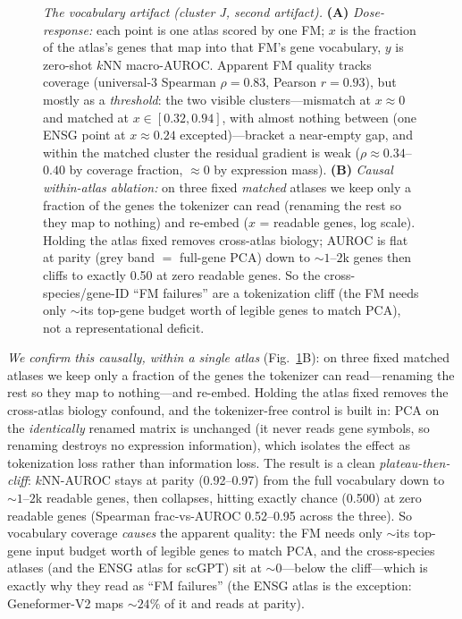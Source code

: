 \documentclass[11pt]{article}
\begin{document}
\begin{figure}[!ht]\centering
\caption{\emph{The vocabulary artifact (cluster J, second artifact).} \textbf{(A)} \emph{Dose-response:} each point is one atlas scored by one FM; $x$ is the fraction of the atlas's genes that map into that FM's gene vocabulary, $y$ is zero-shot $k$NN macro-AUROC. Apparent FM quality tracks coverage (universal-3 Spearman $\rho=0.83$, Pearson $r=0.93$), but mostly as a \emph{threshold}: the two visible clusters---mismatch at $x\!\approx\!0$ and matched at $x\!\in\![0.32,0.94]$, with almost nothing between (one ENSG point at $x\!\approx\!0.24$ excepted)---bracket a near-empty gap, and within the matched cluster the residual gradient is weak ($\rho\approx0.34$--$0.40$ by coverage fraction, $\approx\!0$ by expression mass). \textbf{(B)} \emph{Causal within-atlas ablation:} on three fixed \emph{matched} atlases we keep only a fraction of the genes the tokenizer can read (renaming the rest so they map to nothing) and re-embed ($x$ = readable genes, log scale). Holding the atlas fixed removes cross-atlas biology; AUROC is flat at parity (grey band $=$ full-gene PCA) down to ${\sim}1$--$2$k genes then cliffs to exactly 0.50 at zero readable genes. So the cross-species/gene-ID ``FM failures'' are a tokenization cliff (the FM needs only ${\sim}$its top-gene budget worth of legible genes to match PCA), not a representational deficit.}\label{fig:vocab}\end{figure}

\emph{We confirm this causally, within a single atlas} (Fig.~\ref{fig:vocab}B): on three fixed matched atlases we keep only a fraction of the genes the tokenizer can read---renaming the rest so they map to nothing---and re-embed. Holding the atlas fixed removes the cross-atlas biology confound, and the tokenizer-free control is built in: PCA on the \emph{identically} renamed matrix is unchanged (it never reads gene symbols, so renaming destroys no expression information), which isolates the effect as tokenization loss rather than information loss. The result is a clean \emph{plateau-then-cliff}: $k$NN-AUROC stays at parity (0.92--0.97) from the full vocabulary down to ${\sim}1$--$2$k readable genes, then collapses, hitting exactly chance (0.500) at zero readable genes (Spearman frac-vs-AUROC 0.52--0.95 across the three). So vocabulary coverage \emph{causes} the apparent quality: the FM needs only ${\sim}$its top-gene input budget worth of legible genes to match PCA, and the cross-species atlases (and the ENSG atlas for scGPT) sit at ${\sim}0$---below the cliff---which is exactly why they read as ``FM failures'' (the ENSG atlas is the exception: Geneformer-V2 maps ${\sim}24\%$ of it and reads at parity).
\end{document}
